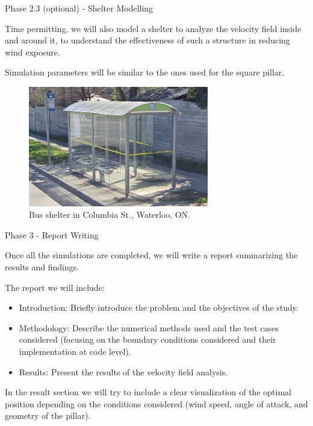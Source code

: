 \begin{frame}{Phase 2.3 (optional) - Shelter Modelling}

    Time permitting, we will also model a shelter to analyze the velocity field inside and around it, to understand the effectiveness of such a structure in reducing wind exposure.

    Simulation parameters will be similar to the ones used for the square pillar.

    \begin{figure}
        \centering
        \includegraphics[width=0.7\textwidth]{img/shelter.png}
        \caption{Bus shelter in Columbia St., Waterloo, ON.}
    \end{figure}

\end{frame}



\begin{frame}{Phase 3 - Report Writing}

    Once all the simulations are completed, we will write a report summarizing the results and findings.

    The report we will include:

    \begin{itemize}
        \item Introduction: Briefly introduce the problem and the objectives of the study.
        \item Methodology: Describe the numerical methods used and the test cases considered (focusing on the boundary conditions considered and their implementation at code level).
        \item Results: Present the results of the velocity field analysis.
    \end{itemize}

    In the result section we will try to include a clear visualization of the optimal position depending on the conditions considered (wind speed, angle of attack, and geometry of the pillar).

\end{frame}